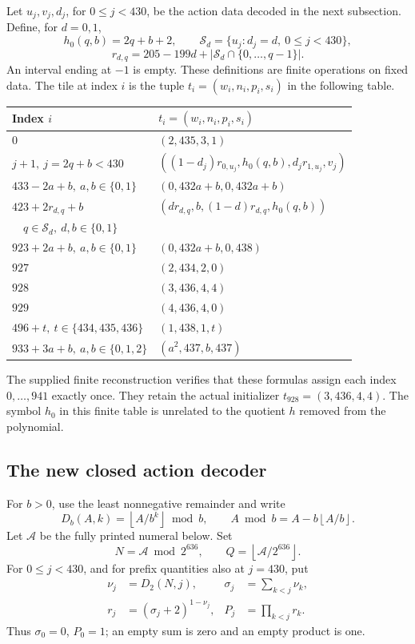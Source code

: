 \documentclass[11pt,letterpaper]{article}
\theoremstyle{definition}
\newcommand{\fl}[1]{\left\lfloor#1\right\rfloor}
\begin{document}
Let \(u_j,v_j,d_j\), for \(0\le j<430\), be the action data decoded in
the next subsection. Define, for \(d=0,1\),
\[
 h_0(q,b)=2q+b+2,\qquad
 \mathcal S_d=\{u_j:d_j=d,\ 0\le j<430\},
\]
\[
 r_{d,q}=205-199d+
       |\mathcal S_d\cap\{0,\ldots,q-1\}|.
\]
An interval ending at \(-1\) is empty. These definitions are finite
operations on fixed data. The tile at index \(i\) is the tuple
\(t_i=(w_i,n_i,p_i,s_i)\) in the following table.

\begin{center}
\small
\setlength{\tabcolsep}{4pt}
\begin{tabular}{@{}ll@{}}
\toprule
Index \(i\) & \(t_i=(w_i,n_i,p_i,s_i)\)\\
\midrule
\(0\) & \((2,435,3,1)\)\\
\(j+1,\ j=2q+b<430\)
 & \(((1-d_j)r_{0,u_j},h_0(q,b),d_jr_{1,u_j},v_j)\)\\
\(433-2a+b,\ a,b\in\{0,1\}\)
 & \((0,432a+b,0,432a+b)\)\\
\(423+2r_{d,q}+b\)
 & \((dr_{d,q},b,(1-d)r_{d,q},h_0(q,b))\)\\
\(\quad q\in\mathcal S_d,\ d,b\in\{0,1\}\)&\\
\(923+2a+b,\ a,b\in\{0,1\}\)
 & \((0,432a+b,0,438)\)\\
\(927\) & \((2,434,2,0)\)\\
\(928\) & \((3,436,4,4)\)\\
\(929\) & \((4,436,4,0)\)\\
\(496+t,\ t\in\{434,435,436\}\)
 & \((1,438,1,t)\)\\
\(933+3a+b,\ a,b\in\{0,1,2\}\)
 & \((a^2,437,b,437)\)\\
\bottomrule
\end{tabular}
\end{center}
The supplied finite reconstruction verifies that these formulas assign
each index \(0,\ldots,941\) exactly once. They retain the actual
initializer \(t_{928}=(3,436,4,4)\). The symbol \(h_0\) in this finite
table is unrelated to the quotient \(h\) removed from the polynomial.

\subsection{The new closed action decoder}

For \(b>0\), use the least nonnegative remainder and write
\[
 D_b(A,k)=\fl{A/b^k}\bmod b,\qquad
 A\bmod b=A-b\fl{A/b}.
\]
Let \(\mathcal A\) be the fully printed numeral below. Set
\[
 N=\mathcal A\bmod 2^{636},\qquad Q=\fl{\mathcal A/2^{636}}.
\]
For \(0\le j<430\), and for prefix quantities also at \(j=430\), put
\begin{align}
 \nu_j&=D_2(N,j),&
 \sigma_j&=\sum_{k<j}\nu_k,\label{eq:prefix}\\
 r_j&=(\sigma_j+2)^{1-\nu_j},&
 P_j&=\prod_{k<j}r_k.\label{eq:radices}
\end{align}
Thus \(\sigma_0=0\), \(P_0=1\); an empty sum is zero and an empty
product is one.
\end{document}
